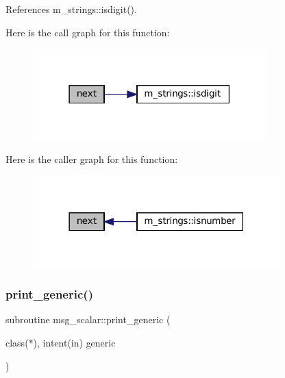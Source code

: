 References m\+\_\+strings\+::isdigit().

Here is the call graph for this function\+:\nopagebreak
\begin{figure}[H]
\begin{center}
\leavevmode
\includegraphics[width=255pt]{M__strings_8f90_a4ca03eba3c35c5b7fbc751d60bc4d1e9_cgraph}
\end{center}
\end{figure}
Here is the caller graph for this function\+:\nopagebreak
\begin{figure}[H]
\begin{center}
\leavevmode
\includegraphics[width=270pt]{M__strings_8f90_a4ca03eba3c35c5b7fbc751d60bc4d1e9_icgraph}
\end{center}
\end{figure}
\mbox{\label{M__strings_8f90_aaa8ee15f943d8e1543ae35ab732c3cd2}} 
\subsubsection{\texorpdfstring{print\+\_\+generic()}{print\_generic()}\hspace{0.1cm}{\footnotesize\ttfamily [1/2]}}
{\footnotesize\ttfamily subroutine msg\+\_\+scalar\+::print\+\_\+generic (\begin{DoxyParamCaption}\item[{class($\ast$), intent(in)}]{generic }\end{DoxyParamCaption})\hspace{0.3cm}{\ttfamily [private]}}

